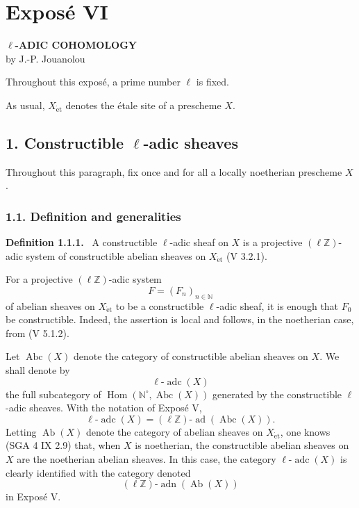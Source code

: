 \documentclass[11pt]{article}
\newenvironment{statement}[1]{\par\medskip\noindent\textbf{#1.}\ }{\par\medskip}
\DeclareMathOperator{\Hom}{Hom}
\providecommand{\Hom}{\operatorname{Hom}}
\providecommand{\adn}{\operatorname{adn}}
\providecommand{\Ab}{\operatorname{Ab}}
\providecommand{\Abc}{\operatorname{Abc}}
\providecommand{\adc}{\operatorname{adc}}
\providecommand{\ad}{\operatorname{ad}}
\providecommand{\adn}{\operatorname{adn}}
\begin{document}
\section*{Exposé VI}

\begin{center}
\textbf{\(\ell\)-ADIC COHOMOLOGY}\\[0.5em]
by J.-P. Jouanolou
\end{center}

Throughout this exposé, a prime number \(\ell\) is fixed.

As usual, \(X_{\mathrm{\acute et}}\) denotes the étale site of a prescheme \(X\).

\subsection*{1. Constructible \(\ell\)-adic sheaves}

Throughout this paragraph, fix once and for all a locally noetherian prescheme \(X\).

\subsubsection*{1.1. Definition and generalities}

\begin{statement}{Definition 1.1.1}
A constructible \(\ell\)-adic sheaf on \(X\) is a projective \((\ell\mathbb Z)\)-adic system of constructible abelian sheaves on \(X_{\mathrm{\acute et}}\) (V 3.2.1).
\end{statement}

For a projective \((\ell\mathbb Z)\)-adic system
\[
F=(F_n)_{n\in\mathbb N}
\]
of abelian sheaves on \(X_{\mathrm{\acute et}}\) to be a constructible \(\ell\)-adic sheaf, it is enough that \(F_0\) be constructible. Indeed, the assertion is local and follows, in the noetherian case, from (V 5.1.2).

Let \(\Abc(X)\) denote the category of constructible abelian sheaves on \(X\). We shall denote by
\[
\ell\text{-}\adc(X)
\]
the full subcategory of \(\Hom(\mathbb N^\circ,\Abc(X))\) generated by the constructible \(\ell\)-adic sheaves. With the notation of Exposé V,
\[
\ell\text{-}\adc(X)=(\ell\mathbb Z)\text{-}\ad(\Abc(X)).
\]
Letting \(\Ab(X)\) denote the category of abelian sheaves on \(X_{\mathrm{\acute et}}\), one knows (SGA 4 IX 2.9) that, when \(X\) is noetherian, the constructible abelian sheaves on \(X\) are the noetherian abelian sheaves. In this case, the category \(\ell\text{-}\adc(X)\) is clearly identified with the category denoted
\[
(\ell\mathbb Z)\text{-}\adn(\Ab(X))
\]
in Exposé V.
\end{document}
